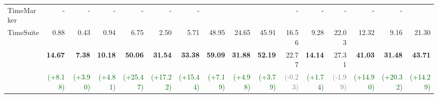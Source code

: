 \begin{table}[t]
{\begin{tabular}{l *{15}{r}}
TimeMarker~\cite{chen2024timemarker} & - & - & - & - & - & - & \cellcolor{gray!20}{51.90} & \cellcolor{gray!20}{26.90} & \cellcolor{gray!20}{48.40} & - & - & -  & - & - \\
TimeSuite~\cite{zeng2024timesuite} & {0.88} & {0.43} & {0.94} & {6.75} & {2.50} & {5.71} & 48.95 & 24.65 & 45.91 & {16.56} & {9.28} & {22.03} & 12.32 & 9.16 & 21.30 \\
\midrule
\rowcolor{green!5} & \textbf{14.67} & \textbf{7.38} & \textbf{10.18} & \textbf{50.06} & \textbf{31.54} & \textbf{33.38} & \textbf{59.09} & \textbf{31.88} & \textbf{52.19} & {22.77} & \textbf{14.14} & {27.31} & \textbf{41.03} & \textbf{31.48} & \textbf{43.71} \\
\rowcolor{green!5} \multirow{-2}{*}{UniTime-Zero}
& {\fontsize{8pt}{10pt}\selectfont \textcolor{darkgreen}{(+8.18)}} 
& {\fontsize{8pt}{10pt}\selectfont \textcolor{darkgreen}{(+3.90)}} 
& {\fontsize{8pt}{10pt}\selectfont \textcolor{darkgreen}{(+4.81)}} 
& {\fontsize{8pt}{10pt}\selectfont \textcolor{darkgreen}{(+25.47)}} 
& {\fontsize{8pt}{10pt}\selectfont \textcolor{darkgreen}{(+17.22)}} 
& {\fontsize{8pt}{10pt}\selectfont \textcolor{darkgreen}{(+15.44)}} 
& {\fontsize{8pt}{10pt}\selectfont \textcolor{darkgreen}{(+7.19)}}
& {\fontsize{8pt}{10pt}\selectfont \textcolor{darkgreen}{(+4.98)}}
& {\fontsize{8pt}{10pt}\selectfont \textcolor{darkgreen}{(+3.79)}}
& {\fontsize{8pt}{10pt}\selectfont \textcolor{gray}{(-0.23)}}
& {\fontsize{8pt}{10pt}\selectfont \textcolor{darkgreen}{(+1.74)}}
& {\fontsize{8pt}{10pt}\selectfont \textcolor{gray}{(-1.99)}}
& {\fontsize{8pt}{10pt}\selectfont \textcolor{darkgreen}{(+14.90)}}
& {\fontsize{8pt}{10pt}\selectfont \textcolor{darkgreen}{(+20.32)}}
& {\fontsize{8pt}{10pt}\selectfont \textcolor{darkgreen}{(+14.29)}}\\
\bottomrule
\end{tabular}}
\vspace{-5pt}
\label{table:sota_table_zs}
\end{table}

